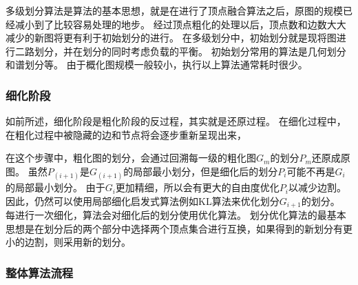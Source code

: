 多级划分算法是算法的基本思想，就是在进行了顶点融合算法之后，原图的规模已经减小到了比较容易处理的地步。
经过顶点粗化的处理以后，顶点数和边数大大减少的新图将更有利于初始划分的进行。
在多级划分中，初始划分就是现将图进行二路划分，并在划分的同时考虑负载的平衡。
初始划分常用的算法是几何划分和谱划分等。
由于概化图规模一般较小，执行以上算法通常耗时很少。

\subsubsection{细化阶段}

如前所述，细化阶段是粗化阶段的反过程，其实就是还原过程。
在细化过程中，在粗化过程中被隐藏的边和节点将会逐步重新呈现出来，

在这个步骤中，粗化图的划分，会通过回溯每一级的粗化图$G_m$的划分$P_m$还原成原图。
虽然$P_(i+1)$是$G_(i+1)$的局部最小划分，但是细化后的划分$P_i$可能不再是$G_i$的局部最小划分。
由于$G_i$更加精细，所以会有更大的自由度优化$P_i$以减少边割。
因此，仍然可以使用局部细化启发式算法例如KL算法来优化划分$G_{i+1}$的划分。
每进行一次细化，算法会对细化后的划分使用优化算法。
划分优化算法的最基本思想是在划分后的两个部分中选择两个顶点集合进行互换，如果得到的新划分有更小的边割，则采用新的划分。

\subsubsection{整体算法流程}

